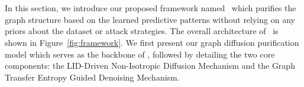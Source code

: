 \section{\ModelName}
In this section, we introduce our proposed framework named \ModelName\, which purifies the graph structure based on the learned predictive patterns without relying on any priors about the dataset or attack strategies. The overall architecture of \ModelName\ is shown in Figure~\ref{fig:framework}.
We first present our graph diffusion purification model which serves as the backbone of \ModelName, 
followed by detailing the two core components: the LID-Driven Non-Isotropic Diffusion Mechanism and the Graph Transfer Entropy Guided Denoising Mechanism. 

